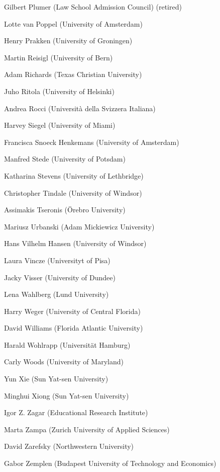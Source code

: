 \begin{compactitem}[]
		\item[] Gilbert Plumer (Law School Admission Council) (retired)
		\item[] Lotte van Poppel (University of Amsterdam)
		\item[] Henry Prakken (University of Groningen)
		\item[] Martin Reisigl (University of Bern)
		\item[] Adam Richards (Texas Christian University)
		\item[] Juho Ritola (University of Helsinki)
		\item[] Andrea Rocci (Università della Svizzera Italiana)
		\item[] Harvey Siegel (University of Miami)
		\item[] Francisca Snoeck Henkemans (University of Amsterdam)
		\item[] Manfred Stede (University of Potsdam)
		\item[] Katharina Stevens (University of Lethbridge)
		\item[] Christopher Tindale (University of Windsor)
		\item[] Assimakis Tseronis (Örebro University)
		\item[] Mariusz Urbanski (Adam Mickiewicz University)
		\item[] Hans Vilhelm Hansen (University of Windsor)
		\item[] Laura Vincze (Universityt of Pisa)
		\item[] Jacky Visser (University of Dundee)
		\item[] Lena Wahlberg (Lund University)
		\item[] Harry Weger (University of Central Florida)
		\item[] David Williams (Florida Atlantic University)
		\item[] Harald Wohlrapp (Universität Hamburg)
		\item[] Carly Woods (University of Maryland)
		\item[] Yun Xie (Sun Yat-sen University)
		\item[] Minghui Xiong (Sun Yat-sen University)
		\item[] Igor Z. Zagar (Educational Research Institute)
		\item[] Marta Zampa (Zurich University of Applied Sciences)
		\item[] David Zarefsky (Northwestern University)
		\item[] Gabor Zemplen (Budapest University of Technology and Economics)
	\end{compactitem}
